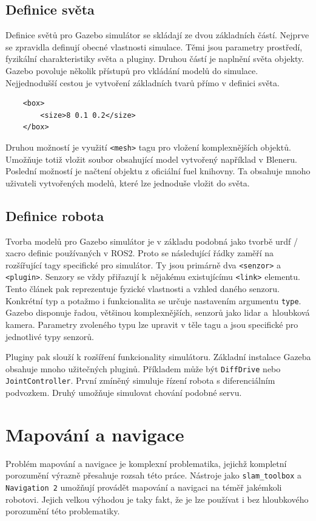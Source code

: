 \subsection*{Definice světa}
Definice světů pro Gazebo simulátor se skládají ze dvou základních částí. Nejprve se zpravidla definují obecné vlastnosti simulace. Těmi jsou parametry prostředí, fyzikální charakteristiky světa a pluginy. Druhou částí je naplnění světa objekty. Gazebo povoluje několik přístupů pro vkládání modelů do simulace. Nejjednodušší cestou je vytvoření základních tvarů přímo v definici světa.
\begin{verbatim}
	<box>
	    <size>8 0.1 0.2</size>
	</box>
\end{verbatim}
Druhou možností je využití \verb|<mesh>| tagu pro vložení komplexnějších objektů. Umožňuje totiž vložit soubor obsahující model vytvořený například v Bleneru. Poslední možností je načtení objektu z oficiální fuel knihovny. Ta obsahuje mnoho uživateli vytvořených modelů, které lze jednoduše vložit do světa. \cite{gazebo_documentation}

\subsection*{Definice robota}
Tvorba modelů pro Gazebo simulátor je v základu podobná jako tvorbě urdf / xacro definic používaných v ROS2. Proto se následující řádky zaměří na rozšířující tagy specifické pro simulátor. Ty jsou primárně dva \verb|<senzor>| a \verb|<plugin>|. Senzory se vždy přiřazují k~nějakému existujícímu \verb|<link>| elementu. Tento článek pak reprezentuje fyzické vlastnosti a vzhled daného senzoru. Konkrétní typ a potažmo i funkcionalita se určuje nastavením argumentu \verb|type|. Gazebo disponuje řadou, většinou komplexnějších, senzorů jako lidar a~hloubková kamera. Parametry zvoleného typu lze upravit v těle tagu a jsou specifické pro jednotlivé typy senzorů. \cite{gazebo_documentation}

Pluginy pak slouží k rozšíření funkcionality simulátoru. Základní instalace Gazeba obsahuje mnoho užitečných pluginů. Příkladem může být \verb|DiffDrive| nebo \verb|JointController|. První zmíněný simuluje řízení robota s diferenciálním podvozkem. Druhý umožňuje simulovat chování podobné servu. \cite{gazebo_documentation}

\section{Mapování a navigace}
Problém mapování a navigace je komplexní problematika, jejichž kompletní porozumění výrazně přesahuje rozsah této práce. Nástroje jako \verb|slam_toolbox| a \verb|Navigation 2| umožňují provádět mapování a navigaci na téměř jakémkoli robotovi. Jejich velkou výhodou je taky fakt, že je lze používat i bez hloubkového porozumění této problematiky.

